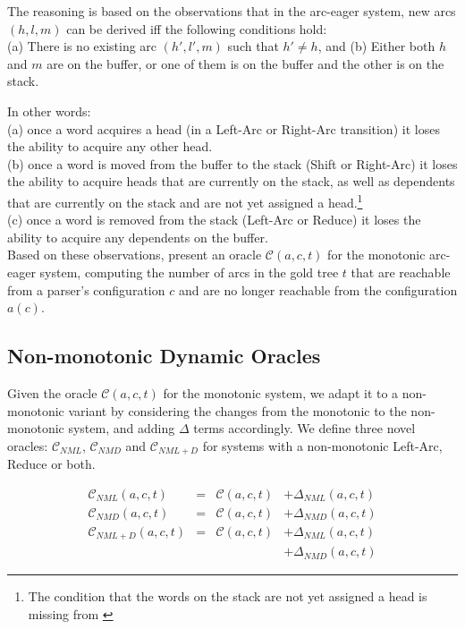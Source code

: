 \documentclass[11pt,letterpaper]{article}
\begin{document}
The reasoning is based on the observations that in the arc-eager system, new
arcs $(h,l,m)$ can be derived iff the following conditions hold:\\
(a) There is no existing arc $(h',l',m)$ such that $h'\neq h$, and 
(b) Either both $h$ and $m$ are on the buffer, or one of them is on the buffer
and the other is on the stack.

\noindent In other words:\\
(a) once a word acquires a head (in a Left-Arc or Right-Arc transition) it loses the ability to acquire
any other head.\\
(b) once a word is moved from the buffer to the stack (Shift or Right-Arc) it loses the ability to
acquire heads that are currently on the stack, as well as dependents that are
currently on the stack and are not yet assigned a head.\footnote{The condition
that the words on the stack are not yet assigned a head is missing from
\citep{goldberg:12}}\\
(c) once a word is removed from the stack (Left-Arc or Reduce) it loses the
ability to acquire any dependents on the buffer.\\
Based on these observations, \citet{goldberg:12} present an oracle
$\mathcal{C}(a,c,t)$ for the monotonic arc-eager system, computing the number
of arcs in the gold tree $t$ that are reachable from a parser's configuration
$c$ and are no longer reachable from the configuration $a(c)$.

\subsection{Non-monotonic Dynamic Oracles}

Given the oracle $\mathcal{C}(a,c,t)$ for the monotonic system,
we adapt it to a non-monotonic variant by considering the changes from the
monotonic to the non-monotonic system, and adding $\Delta$ terms accordingly.
We define three novel oracles: $\mathcal{C}_{NML}$, $\mathcal{C}_{NMD}$ and
$\mathcal{C}_{NML+D}$ for systems with a non-monotonic Left-Arc, Reduce or both.

\[\begin{array}{lcll} 
\mathcal{C}_{NML}(a,c,t)& = &\mathcal{C}(a,c,t)&+ \Delta_{NML}(a,c,t)\\
\mathcal{C}_{NMD}(a,c,t)& = &\mathcal{C}(a,c,t)&+ \Delta_{NMD}(a,c,t)\\
\mathcal{C}_{NML+D}(a,c,t)& = &\mathcal{C}(a,c,t)&+ \Delta_{NML}(a,c,t)\\ 
                                     &  & &+ \Delta_{NMD}(a,c,t)
\end{array}\]
\end{document}
